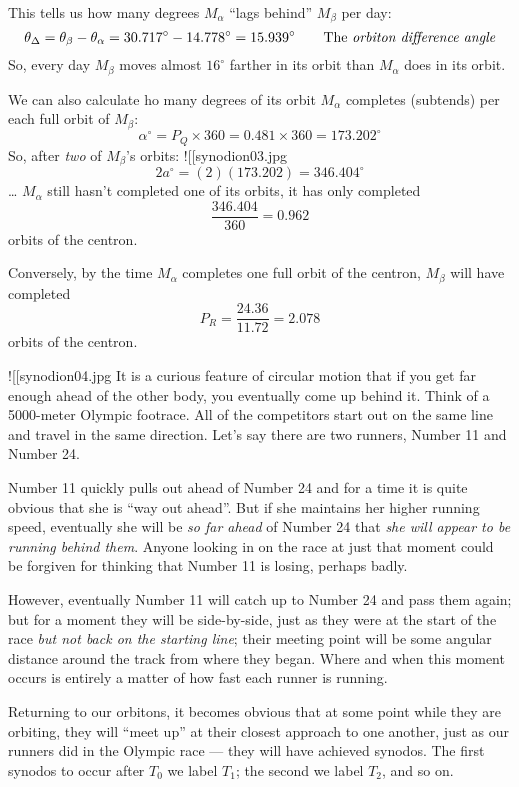 \documentclass[
  letterpaper,
]{book}
\begin{document}
This tells us how many degrees \(M_\alpha\) ``lags behind'' \(M_\beta\)
per day: \[
\theta_\Delta = \theta_\beta - \theta_\alpha = 30.717^\circ - 14.778^\circ = 15.939^\circ \qquad \text{The \emph{orbiton difference angle}}
\] So, every day \(M_\beta\) moves almost \(16^\circ\) farther in its
orbit than \(M_\alpha\) does in its orbit.

We can also calculate ho many degrees of its orbit \(M_\alpha\)
completes (subtends) per each full orbit of \(M_\beta\): \[
\alpha^\circ = P_Q \times 360 = 0.481 \times 360 = 173.202^\circ 
\] So, after \emph{two} of \(M_\beta\)'s orbits:
!{[}{[}synodion03.jpg\textbar300{]}{]} \[
2 a^\circ = (2)(173.202) = 346.404^\circ
\] \ldots{} \(M_\alpha\) still hasn't completed one of its orbits, it
has only completed \[
\dfrac{346.404}{360} = 0.962
\] orbits of the centron.

Conversely, by the time \(M_\alpha\) completes one full orbit of the
centron, \(M_\beta\) will have completed \[
P_R = \dfrac{24.36}{11.72} = 2.078
\] orbits of the centron.

!{[}{[}synodion04.jpg\textbar300{]}{]} It is a curious feature of
circular motion that if you get far enough ahead of the other body, you
eventually come up behind it. Think of a 5000-meter Olympic footrace.
All of the competitors start out on the same line and travel in the same
direction. Let's say there are two runners, Number 11 and Number 24.

Number 11 quickly pulls out ahead of Number 24 and for a time it is
quite obvious that she is ``way out ahead''. But if she maintains her
higher running speed, eventually she will be \emph{so far ahead} of
Number 24 that \emph{she will appear to be running behind them}. Anyone
looking in on the race at just that moment could be forgiven for
thinking that Number 11 is losing, perhaps badly.

However, eventually Number 11 will catch up to Number 24 and pass them
again; but for a moment they will be side-by-side, just as they were at
the start of the race \emph{but not back on the starting line}; their
meeting point will be some angular distance around the track from where
they began. Where and when this moment occurs is entirely a matter of
how fast each runner is running.

Returning to our orbitons, it becomes obvious that at some point while
they are orbiting, they will ``meet up'' at their closest approach to
one another, just as our runners did in the Olympic race --- they will
have achieved synodos. The first synodos to occur after \(T_0\) we label
\(T_1\); the second we label \(T_2\), and so on.
\end{document}
